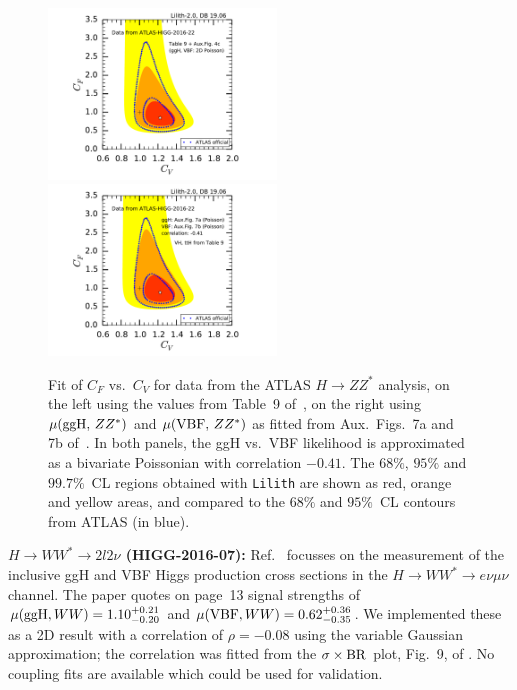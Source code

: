 \begin{figure}[h!]\centering
\includegraphics[width=0.54\textwidth]{validation/ATLAS/HIGG-2016-22-CVCF-official.pdf}%
\hspace{-13mm}\includegraphics[width=0.54\textwidth]{validation/ATLAS/HIGG-2016-22-CVCF-fit.pdf}%
\vspace*{-2mm}
\caption{Fit of $C_F$ vs.\ $C_V$ for data from the ATLAS $H\to ZZ^*$ analysis, 
on the left using the values from Table~9 of~\cite{Aaboud:2017vzb}, on the right using 
$\mu({\rm ggH},\,ZZ^*)$ and $\mu({\rm VBF},\,ZZ^*)$ as fitted from Aux.\ Figs.~7a and 7b of~\cite{Aaboud:2017vzb}. 
In both panels, the ggH vs.\ VBF likelihood is approximated as a bivariate Poissonian with correlation $-0.41$. 
The  $68\%$,  $95\%$ and $99.7\%$~CL regions obtained with {\tt Lilith} are shown as red, orange and yellow areas, 
and compared to the $68\%$ and  $95\%$~CL contours from ATLAS (in blue).}
\label{fig:validation_atlas_ZZ}
\end{figure}


{\bf\boldmath $H\to WW^*\to 2l2\nu$ (HIGG-2016-07):} Ref.~\cite{Aaboud:2018jqu} focusses on the measurement of the 
inclusive ggH and VBF Higgs production cross sections in the $H\to WW^*\to e\nu\mu\nu$ channel. The paper quotes 
on page~13 signal strengths of $\mu({\rm ggH}, WW)=1.10^{+0.21}_{-0.20}$ and $\mu({\rm VBF}, WW)=0.62^{+0.36}_{-0.35}$. 
We implemented these as a 2D result with a correlation of $\rho=-0.08$ using the variable Gaussian approximation; 
the correlation was fitted from the $\sigma\times{\rm BR}$ plot, Fig.~9, of \cite{Aaboud:2018jqu}. 
No coupling fits are available which could be used for validation. \\

